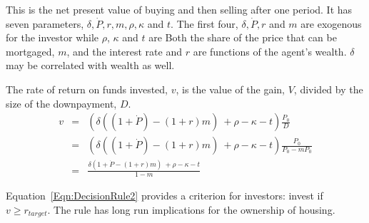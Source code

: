 This is the  net present value of buying and then selling after one period. It has  seven  parameters, $\delta, \dot P, r, m, \rho, \kappa$ and $t$. The first four, $\delta, \dot P, r$ and $m$ are exogenous for the investor while $\rho$, $\kappa$ and $t$  are    %
Both the  share of the price  that can be mortgaged, $m$, and the interest rate  and $r$ are functions of the agent's wealth. $\delta$ may be correlated with wealth as well. 



The rate of return on funds invested, $v$, is the value of the gain, $V$, divided by  the size of the downpayment, $D$. 
\begin{eqnarray}
v&=&( \delta((1+\dot P)  - (1+r)m) \ + \rho   	-\kappa - t ) \frac{P_0}{D}   \nonumber\\
		&=&( \delta((1+\dot P)  - (1+r)m) \ + \rho   	-\kappa - t ) \frac{P_0}{P_0-mP_0}   \nonumber\\ 
		&=&\frac{ \delta(1+\dot P  - (1+r)m) \ + \rho   	-\kappa - t } {1-m} \label{Eqn:DecisionRule2}
\end{eqnarray}

Equation~\ref{Eqn:DecisionRule2} provides a criterion for investors: invest if $v \geq r_{target}$. The rule has long run implications for the ownership of housing. 



